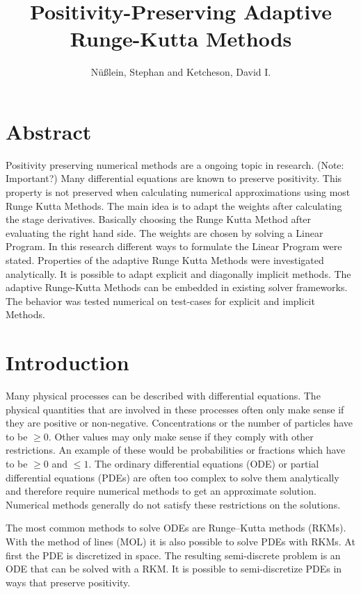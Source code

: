 \documentclass[a4paper]{scrartcl}
\title{Positivity-Preserving Adaptive Runge-Kutta Methods}
\author{Nüßlein, Stephan and Ketcheson, David I.}
\numberwithin{equation}{section}
\theoremstyle{plain}
\theoremstyle{definition}
\numberwithin{theorem}{section}
\newcommand{\1}{\mathbbm{1}}
\begin{document}
\maketitle

\section*{Abstract}
Positivity preserving numerical methods are a ongoing topic in research. 
(Note: Important?)
Many differential equations are known to preserve positivity. 
This property is not preserved when calculating numerical approximations using most Runge Kutta Methods.
The main idea is to adapt the weights after calculating the stage derivatives. 
Basically choosing the Runge Kutta Method after evaluating the right hand side. 
The weights are chosen by solving a Linear Program. 
In this research different ways to formulate the Linear Program were stated. 
Properties of the adaptive Runge Kutta Methods were investigated analytically.
It is possible to adapt explicit and diagonally implicit methods. 
The adaptive Runge-Kutta Methods can be embedded in existing solver frameworks. 
The behavior was tested numerical on test-cases for explicit and implicit Methods.



\section{Introduction}


Many physical processes can be described with differential equations. 
The physical quantities that are involved in these processes often only make sense if they are positive or non-negative. 
Concentrations or the number of particles have to be $\geq 0$.
Other values may only make sense if they comply with other restrictions. An example of these would be probabilities or fractions which have to be $\geq 0$ and $\leq 1$.
The ordinary differential equations (ODE) or partial differential equations (PDEs) are often too complex to solve them analytically and therefore require numerical methods to get an approximate solution.
Numerical methods generally do not satisfy these restrictions on the solutions.

The most common methods to solve ODEs are Runge–Kutta methods (RKMs). 
With the method of lines (MOL) it is also possible to solve PDEs with RKMs.
At first the PDE is discretized in space. The resulting semi-discrete problem is an ODE that can be solved with a RKM. 
It is possible to semi-discretize PDEs in ways that preserve positivity\cite{kopecz_comparison_2019,kopecz_unconditionally_2018}.
\end{document}
